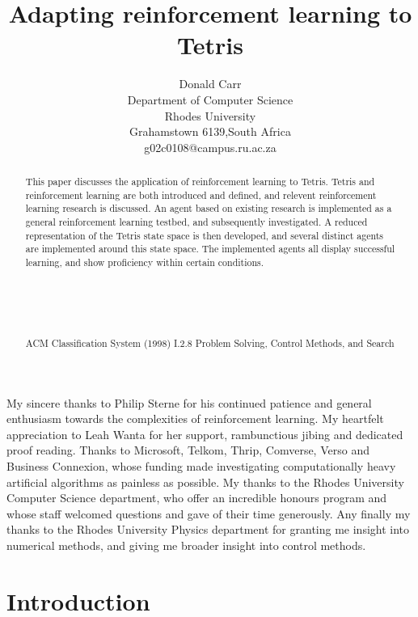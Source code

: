 \documentclass{rucsthesis}
\title{Adapting reinforcement learning to Tetris}
\author{Donald Carr \\ Department of Computer Science \\ Rhodes University \\ Grahamstown 6139,South Africa \\ g02c0108@campus.ru.ac.za}
\begin{document}
\maketitle

\begin{abstract}

This paper discusses the application of reinforcement learning to Tetris. Tetris and reinforcement learning are both introduced and defined, and relevent reinforcement learning research is discussed. An agent based on existing research is implemented as a general reinforcement learning testbed, and subsequently investigated. A reduced representation of the Tetris state space is then developed, and several distinct agents are implemented around this state space. The implemented agents all display successful learning, and show proficiency within certain conditions.\\
\\
\\
\\
\\
\\
ACM Classification System (1998) I.2.8 Problem Solving, Control Methods, and Search

\end{abstract}

\begin{acknowledgements}

My sincere thanks to Philip Sterne for his continued patience and general enthusiasm towards the complexities of reinforcement learning. My heartfelt appreciation to Leah Wanta for her support, rambunctious jibing and dedicated proof reading. Thanks to Microsoft, Telkom, Thrip, Comverse, Verso and Business Connexion, whose funding made investigating computationally heavy artificial algorithms as painless as possible. My thanks to the Rhodes University Computer Science department, who offer an incredible honours program and whose staff welcomed questions and gave of their time generously. Any finally my thanks to the Rhodes University Physics department for granting me insight into numerical methods, and giving me broader insight into control methods.

\end{acknowledgements}

\tableofcontents
\pagebreak
\listoffigures
\pagebreak
\listoftables
\pagebreak

\chapter{Introduction}
\end{document}

